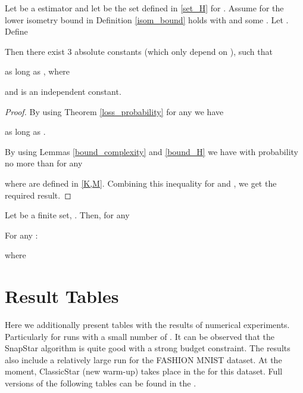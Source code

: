 \begin{theorem}
    \label{main_th}
        Let  be a  estimator and let  be the set defined in \ref{set_H} for .
        Assume for  the lower isometry bound in Definition \ref{isom_bound} holds with  and some . Let .
        Define
        
        Then there exist 3 absolute constants  (which only depend on ), such that 
        
        as long as , 
        where 
        
        
        and  is an independent constant.
\end{theorem}

\begin{proof}



    By using Theorem \ref{loss_probability} for any
         we have
        

        as long as .
        
By using Lemmas \ref{bound_complexity} and \ref{bound_H} we have with probability no more than  for any 

    
    where  are defined in \eqref{K,M}.
Combining this inequality for  and ,  we get the required result.
\end{proof}

    \begin{lemma}[Lemma 9]
    \label{finite_bound}
        Let  be a finite set, . Then, for any 
        
        For any :
        
        where
        
    \end{lemma}

\clearpage    
\section{Result Tables}\label{Appendix B}

Here we additionally present tables with the results of numerical experiments. Particularly for runs with a small number of . It can be observed that the SnapStar algorithm is quite good with a strong budget constraint.
The results also include a relatively large run for the FASHION MNIST dataset. At the moment, ClassicStar (new warm-up) takes  place in the  for this dataset.
Full versions of the following tables can be found in the .

